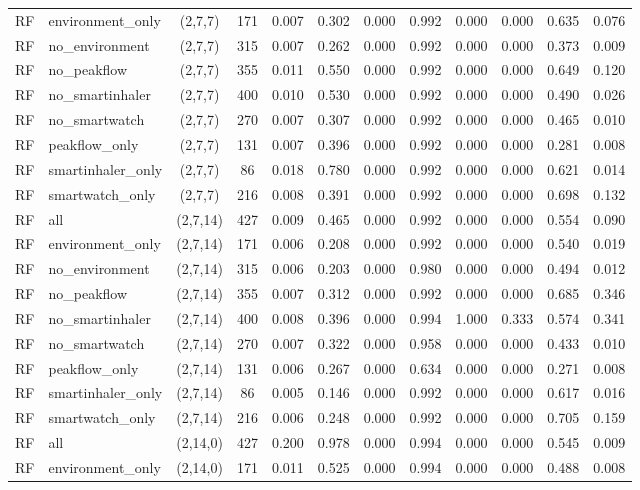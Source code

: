 \begin{longtable}{llcccccccccc}
RF & environment\_only & (2,7,7) & 171 & 0.007 & 0.302 & 0.000 & 0.992 & 0.000 & 0.000 & 0.635 & 0.076 \\
RF & no\_environment & (2,7,7) & 315 & 0.007 & 0.262 & 0.000 & 0.992 & 0.000 & 0.000 & 0.373 & 0.009 \\
RF & no\_peakflow & (2,7,7) & 355 & 0.011 & 0.550 & 0.000 & 0.992 & 0.000 & 0.000 & 0.649 & 0.120 \\
RF & no\_smartinhaler & (2,7,7) & 400 & 0.010 & 0.530 & 0.000 & 0.992 & 0.000 & 0.000 & 0.490 & 0.026 \\
RF & no\_smartwatch & (2,7,7) & 270 & 0.007 & 0.307 & 0.000 & 0.992 & 0.000 & 0.000 & 0.465 & 0.010 \\
RF & peakflow\_only & (2,7,7) & 131 & 0.007 & 0.396 & 0.000 & 0.992 & 0.000 & 0.000 & 0.281 & 0.008 \\
RF & smartinhaler\_only & (2,7,7) & 86 & 0.018 & 0.780 & 0.000 & 0.992 & 0.000 & 0.000 & 0.621 & 0.014 \\
RF & smartwatch\_only & (2,7,7) & 216 & 0.008 & 0.391 & 0.000 & 0.992 & 0.000 & 0.000 & 0.698 & 0.132 \\
RF & all & (2,7,14) & 427 & 0.009 & 0.465 & 0.000 & 0.992 & 0.000 & 0.000 & 0.554 & 0.090 \\
RF & environment\_only & (2,7,14) & 171 & 0.006 & 0.208 & 0.000 & 0.992 & 0.000 & 0.000 & 0.540 & 0.019 \\
RF & no\_environment & (2,7,14) & 315 & 0.006 & 0.203 & 0.000 & 0.980 & 0.000 & 0.000 & 0.494 & 0.012 \\
RF & no\_peakflow & (2,7,14) & 355 & 0.007 & 0.312 & 0.000 & 0.992 & 0.000 & 0.000 & 0.685 & 0.346 \\
RF & no\_smartinhaler & (2,7,14) & 400 & 0.008 & 0.396 & 0.000 & 0.994 & 1.000 & 0.333 & 0.574 & 0.341 \\
RF & no\_smartwatch & (2,7,14) & 270 & 0.007 & 0.322 & 0.000 & 0.958 & 0.000 & 0.000 & 0.433 & 0.010 \\
RF & peakflow\_only & (2,7,14) & 131 & 0.006 & 0.267 & 0.000 & 0.634 & 0.000 & 0.000 & 0.271 & 0.008 \\
RF & smartinhaler\_only & (2,7,14) & 86 & 0.005 & 0.146 & 0.000 & 0.992 & 0.000 & 0.000 & 0.617 & 0.016 \\
RF & smartwatch\_only & (2,7,14) & 216 & 0.006 & 0.248 & 0.000 & 0.992 & 0.000 & 0.000 & 0.705 & 0.159 \\
RF & all & (2,14,0) & 427 & 0.200 & 0.978 & 0.000 & 0.994 & 0.000 & 0.000 & 0.545 & 0.009 \\
RF & environment\_only & (2,14,0) & 171 & 0.011 & 0.525 & 0.000 & 0.994 & 0.000 & 0.000 & 0.488 & 0.008 \\

\end{longtable}
